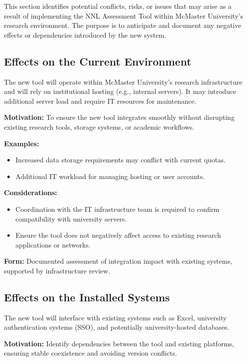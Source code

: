 \documentclass[12pt]{article}
\begin{document}
This section identifies potential conflicts, risks, or issues that may arise as a result of implementing the NNL Assessment Tool within McMaster University’s research environment. The purpose is to anticipate and document any negative effects or dependencies introduced by the new system.

\subsection{Effects on the Current Environment}

The new tool will operate within McMaster University’s research infrastructure and will rely on institutional hosting (e.g., internal servers). It may introduce additional server load and require IT resources for maintenance.

\textbf{Motivation:} To ensure the new tool integrates smoothly without disrupting existing research tools, storage systems, or academic workflows.

\textbf{Examples:}
\begin{itemize}
    \item Increased data storage requirements may conflict with current quotas.
    \item Additional IT workload for managing hosting or user accounts.
\end{itemize}

\textbf{Considerations:}
\begin{itemize}
    \item Coordination with the IT infrastructure team is required to confirm compatibility with university servers.
    \item Ensure the tool does not negatively affect access to existing research applications or networks.
\end{itemize}

\textbf{Form:} Documented assessment of integration impact with existing systems, supported by infrastructure review.

\subsection{Effects on the Installed Systems}

The new tool will interface with existing systems such as Excel, university authentication systems (SSO), and potentially university-hosted databases.

\textbf{Motivation:} Identify dependencies between the tool and existing platforms, ensuring stable coexistence and avoiding version conflicts.
\end{document}
